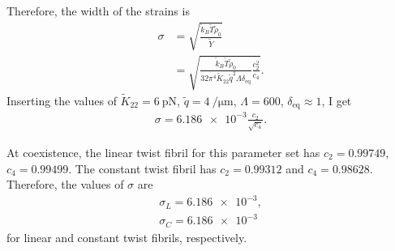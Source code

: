 \documentclass[12pt]{article}
\begin{document}
Therefore, the width of the strains is
\begin{align}
\sigma&=\sqrt{\frac{\tilde{k}_B\tilde{T}\tilde{\rho}_0}{\tilde{Y}}}\nonumber\\
&=\sqrt{\frac{\tilde{k}_B\tilde{T}\tilde{\rho}_0}{32\pi^4\tilde{K}_{22}\tilde{q}^2\Lambda\delta_{\mathrm{eq}}}\frac{c_2^2}{c_4}}.
\end{align}
Inserting the values of $\tilde{K}_{22}=\SI{6}{\pico\newton}$, $\tilde{q}=\SI{4}{\per\micro\meter}$, $\Lambda=600$, $\delta_{\mathrm{eq}}\approx1$, I get
\begin{align}
\sigma=\num{6.186e-3}\frac{c_2}{\sqrt{c_4}}.
\end{align}

At coexistence, the linear twist fibril for this parameter set has $c_2=0.99749$, $c_4=0.99499$. The constant twist fibril has $c_2=0.99312$ and $c_4=0.98628$. Therefore, the values of $\sigma$ are
\begin{align}
\sigma_L=\num{6.186e-3},\\
\sigma_C=\num{6.186e-3}
\end{align}
for linear and constant twist fibrils, respectively.
\end{document}

